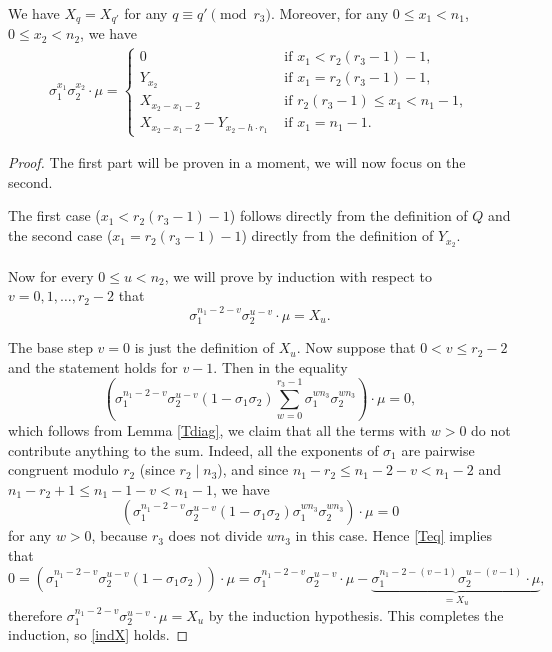 \begin{lemma}\label{XY}
We have $X_q=X_{q'}$ for any $q\equiv q'\pmod {r_3}$. Moreover,
for any $0\leq x_1<n_1$, $0\leq x_2<n_2$, we have
\begin{align*}
\sigma_1^{x_1}\sigma_2^{x_2}\cdot \mu=
\begin{cases}
0   &\text{ if }  x_1<r_2(r_3-1)-1,\\
Y_{x_2} \quad &\text{ if } x_1=r_2(r_3-1)-1, \\
X_{x_2-x_1-2}  \quad &\text{ if } r_2(r_3-1)\leq x_1<n_1-1, \\
X_{x_2-x_1-2}-Y_{x_2-h\cdot r_1} &\text{ if }  x_1=n_1-1.
\end{cases}
\end{align*}
\end{lemma}
\begin{proof}
The first part will be proven in a moment, we will now focus on the second.

The first case ($x_1<r_2(r_3-1)-1$) follows directly from the definition of $Q$ and the second case ($x_1=r_2(r_3-1)-1$) directly from the definition of $Y_{x_2}$.

\paragraph*{}
Now for every $0\leq u <n_2$, we will prove by induction with respect to $v=0,1,\dots,r_2-2$ that 
\begin{equation}\label{indX}
\sigma_1^{n_1-2-v}\sigma_2^{u-v}\cdot \mu =X_u.
\end{equation}

The base step $v=0$ is just the definition of $X_u$. Now suppose that $0<v\leq r_2-2$ and the statement holds for $v-1$. Then in the equality
\begin{equation}\label{Teq}
\left(\sigma_1^{n_1-2-v}\sigma_2^{u-v}(1-\sigma_1\sigma_2)\sum_{w=0}^{r_3-1}\sigma_1^{wn_3}\sigma_2^{wn_3}\right)\cdot \mu=0,
\end{equation}
which follows from Lemma \ref{Tdiag}, we claim that all the terms with $w>0$ do not contribute anything to the sum. Indeed, all the exponents of $\sigma_1$ are pairwise congruent modulo $r_2$ (since $r_2\mid n_3$), and since $n_1-r_2\leq n_1-2-v<n_1-2$ and $n_1-r_2+1\leq n_1-1-v<n_1-1$, we have $$\left(\sigma_1^{n_1-2-v}\sigma_2^{u-v}(1-\sigma_1\sigma_2)\sigma_1^{wn_3}\sigma_2^{wn_3}\right)\cdot \mu=0$$ for any $w>0$, because  $r_3$ does not divide $wn_3$ in this case. Hence \eqref{Teq} implies that
$$0=\left(\sigma_1^{n_1-2-v}\sigma_2^{u-v}(1-\sigma_1\sigma_2)\right)\cdot \mu=\sigma_1^{n_1-2-v}\sigma_2^{u-v}\cdot \mu-\underbrace{\sigma_1^{n_1-2-(v-1)}\sigma_2^{u-(v-1)}\cdot \mu}_{=X_u},$$
therefore $\sigma_1^{n_1-2-v}\sigma_2^{u-v}\cdot \mu=X_u$ by the induction hypothesis. This completes the induction, so \eqref{indX} holds.


\end{proof}
